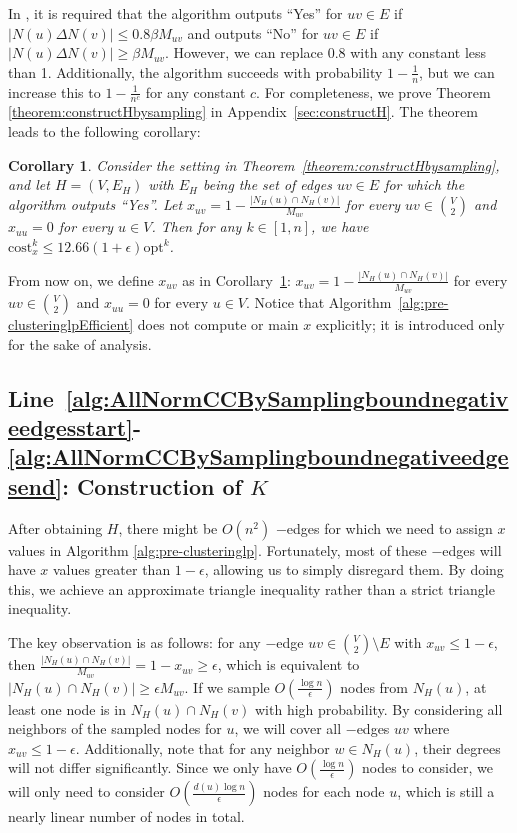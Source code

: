 \documentclass[11pt]{article}
\newcommand{\cost}{\mathrm{cost}}
\newtheorem{coro}[theorem]{Corollary}
\newcommand{\opt}{{\mathrm{opt}}}
\begin{document}
\begin{CJK*}{UTF8}{gbsn}
In \cite{cohen2021correlation}, it is required that the algorithm outputs ``Yes'' for $uv \in E$ if $|N(u) \Delta N(v)| \leq 0.8 \beta M_{uv}$ and outputs ``No'' for $uv \in E$ if $|N(u) \Delta N(v)| \geq \beta M_{uv}$. However, we can replace 0.8 with any constant less than 1. Additionally, the algorithm succeeds with probability $1 - \frac{1}{n}$, but we can increase this to $1 - \frac{1}{n^c}$ for any constant $c$. For completeness, we prove Theorem \ref{theorem:constructHbysampling} in Appendix~\ref{sec:constructH}. The theorem leads to the following corollary:
\begin{coro}
    \label{coro:constructHbysampling}
    Consider the setting in Theorem~\ref{theorem:constructHbysampling}, and let $H = (V, E_H)$ with $E_H$ being the set of edges $uv \in E$ for which the algorithm outputs ``Yes''. Let $x_{uv} = 1 - \frac{|N_H(u) \cap N_H(v)|}{M_{uv}}$ for every $uv \in {V \choose 2}$ and $x_{uu} = 0$ for every $u \in V$. Then for any $k \in [1, n]$, we have $\cost^k_x \leq 12.66(1 + \epsilon) \opt^k$.
\end{coro}



From now on, we define $x_{uv}$ as in Corollary~\ref{coro:constructHbysampling}: $x_{uv} = 1 - \frac{|N_H(u) \cap N_H(v)|}{M_{uv}}$ for every $uv \in {V \choose 2}$ and $x_{uu} = 0$ for every $u \in V$. Notice that Algorithm~\ref{alg:pre-clusteringlpEfficient} does not compute or main $x$ explicitly; it is introduced only for the sake of analysis. 

\subsection{Line~\ref{alg:AllNormCCBySamplingboundnegativeedgesstart}-\ref{alg:AllNormCCBySamplingboundnegativeedgesend}: Construction of $K$} 
After obtaining $H$, there might be $O(n^2)$ $-$edges for which we need to assign $x$ values in Algorithm \ref{alg:pre-clusteringlp}. Fortunately, most of these $-$edges will have $x$ values greater than $1 - \epsilon$, allowing us to simply disregard them. By doing this, we achieve an approximate triangle inequality rather than a strict triangle inequality.  

The key observation is as follows: for any $-$edge $uv \in {V \choose 2} \setminus E$ with $x_{uv} \leq 1 - \epsilon$, then $\frac{|N_H(u) \cap N_H(v)|}{M_{uv}} = 1 - x_{uv} \geq \epsilon$, which is equivalent to $|N_H(u) \cap N_H(v)| \geq \epsilon M_{uv}$. If we sample $O\left(\frac{\log n}{\epsilon}\right)$ nodes from $N_{H}(u)$,  at least one node is in $N_H(u) \cap N_H(v)$ with high probability. By considering all neighbors of the sampled nodes for $u$, we will cover all $-$edges $uv$ where $x_{uv} \leq 1 - \epsilon$. Additionally, note that for any neighbor $w \in N_H(u)$, their degrees will not differ significantly. Since we only have $O\left(\frac{\log n}{\epsilon}\right)$ nodes to consider, we will only need to consider $O\left(\frac{d(u) \log n}{\epsilon}\right)$ nodes for each node $u$, which is still a nearly linear number of nodes in total. 




\end{CJK*}
\end{document}
